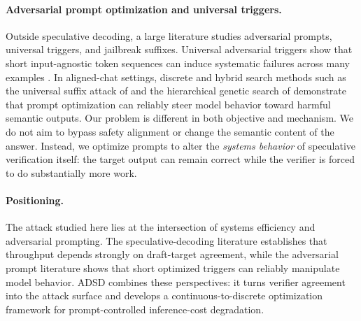 \paragraph{Adversarial prompt optimization and universal triggers.}
Outside speculative decoding, a large literature studies adversarial prompts,
universal triggers, and jailbreak suffixes. Universal adversarial triggers show
that short input-agnostic token sequences can induce systematic failures across
many examples \citep{wallace2019uat}. In aligned-chat settings, discrete and
hybrid search methods such as the universal suffix attack of
\citet{zou2023universal} and the hierarchical genetic search of
\citet{liu2023autodan} demonstrate that prompt optimization can reliably steer
model behavior toward harmful semantic outputs. Our problem is different in
both objective and mechanism. We do not aim to bypass safety alignment or
change the semantic content of the answer. Instead, we optimize prompts to
alter the \emph{systems behavior} of speculative verification itself: the
target output can remain correct while the verifier is forced to do
substantially more work.

\paragraph{Positioning.}
The attack studied here lies at the intersection of systems efficiency and
adversarial prompting. The speculative-decoding literature establishes that
throughput depends strongly on draft-target agreement, while the adversarial
prompt literature shows that short optimized triggers can reliably manipulate
model behavior. ADSD combines these perspectives: it turns verifier agreement
into the attack surface and develops a continuous-to-discrete optimization
framework for prompt-controlled inference-cost degradation.
